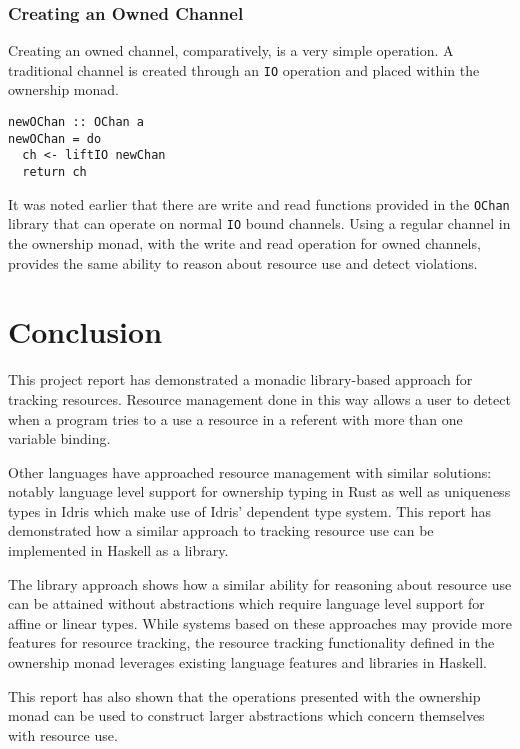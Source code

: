 \documentclass[onehalf,11pt]{beavtex}
\begin{document}
\subsection{Creating an Owned Channel}

Creating an owned channel, comparatively, is a very simple operation.
A traditional channel is created through an \texttt{IO} operation and placed
within the ownership monad.

\begin{verbatim}
newOChan :: OChan a
newOChan = do
  ch <- liftIO newChan
  return ch
\end{verbatim}

It was noted earlier that there are write and read functions provided
in the \texttt{OChan} library that can operate on normal \texttt{IO} bound
channels.  Using a regular channel in the ownership monad,
with the write and read operation for owned channels,
provides the same ability to reason about resource use and detect violations.



\chapter{Conclusion}

This project report has demonstrated a monadic library-based approach for
tracking resources.
Resource management done in this way allows a user to detect when a program
tries to a use a resource in a referent with more than one variable binding.

Other languages have approached resource management with similar
solutions: notably language level support for ownership typing in Rust as well
as uniqueness types in Idris which make use of Idris' dependent type system.
This report has demonstrated how a similar approach to tracking resource use can be
implemented in Haskell as a library.

The library approach shows how a similar ability for reasoning about resource use
can be attained without abstractions which require language level support for
affine or linear types.
While systems based on these approaches may provide more features for resource
tracking, the resource tracking functionality defined in the ownership
monad leverages existing language features and libraries in Haskell.

This report has also shown that the operations presented with the ownership monad
can be used to construct larger abstractions which concern themselves with
resource use.


{}

\end{document}
